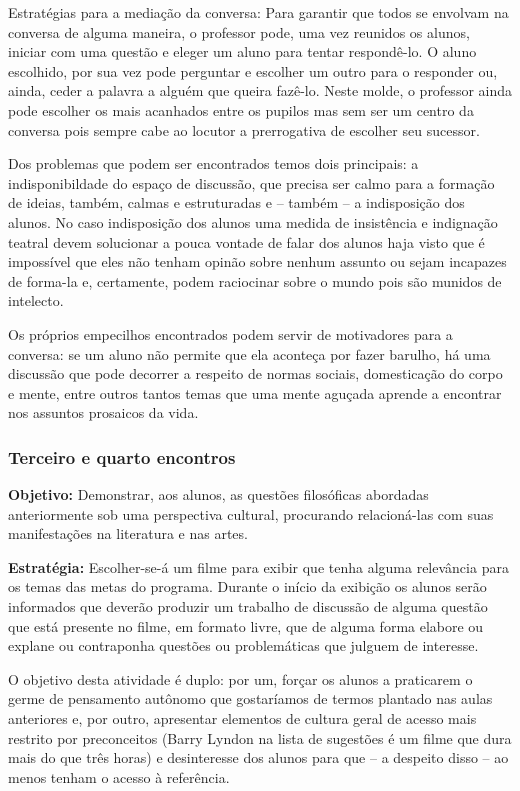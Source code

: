 \documentclass[12pt,a4paper]{article}
\newenvironment{citac}{
	\begin{addmargin}[4cm]{1em} \footnotesize}{\normalfont \end{addmargin}
}
\begin{document}
\begin{citac}
	Estratégias para a mediação da conversa: Para garantir que todos 
	se envolvam na conversa de alguma maneira, o professor pode, uma 
	vez reunidos os alunos, iniciar com uma questão e eleger um aluno 
	para tentar respondê-lo. O aluno escolhido, por sua vez pode 
	perguntar e escolher um outro para o responder ou, ainda, ceder a 
	palavra a alguém que queira fazê-lo. Neste molde, o professor 
	ainda pode escolher os mais acanhados entre os pupilos mas sem 
	ser um centro da conversa pois sempre cabe ao locutor a 
	prerrogativa de escolher seu sucessor.
	
	Dos problemas que podem ser encontrados temos dois principais:
	a indisponibildade do espaço de discussão, que precisa ser calmo 
	para a formação de ideias, também, calmas e estruturadas e -- 
	também -- a indisposição dos alunos. No caso indisposição dos 
	alunos uma medida de insistência e indignação teatral devem 
	solucionar a pouca vontade de falar dos alunos haja visto que é 
	impossível que eles não tenham opinão sobre nenhum assunto ou 
	sejam incapazes de forma-la e, certamente, podem raciocinar sobre 
	o mundo pois são munidos de intelecto.

	Os próprios empecilhos encontrados podem servir de motivadores 
	para a conversa: se um aluno não permite que ela aconteça por 
	fazer barulho, há uma discussão que pode decorrer a respeito 
	de normas sociais, domesticação do corpo e mente, entre outros 
	tantos temas que uma mente aguçada aprende a encontrar nos 
	assuntos prosaicos da vida.

	\subsubsection{Terceiro e quarto encontros}
	
	\textbf{Objetivo:} Demonstrar, aos alunos, as questões 
	filosóficas abordadas anteriormente sob uma perspectiva 
	cultural, procurando relacioná-las com suas manifestações 
	na literatura e nas artes. 

	\textbf{Estratégia:}
	Escolher-se-á um filme para exibir que tenha alguma relevância 
	para os temas das metas do programa. Durante o início da 
	exibição os alunos serão informados que deverão produzir um 
	trabalho de discussão de alguma questão que está presente no 
	filme, em formato livre, que de alguma forma elabore ou 
	explane ou contraponha questões ou problemáticas que julguem
	de interesse. 

	O objetivo desta atividade é duplo: por um, forçar os alunos 
	a praticarem o germe de pensamento autônomo que gostaríamos 
	de termos plantado nas aulas anteriores e, por outro, apresentar
	elementos de cultura geral de acesso mais restrito por 
	preconceitos (Barry Lyndon na lista de sugestões é um filme 
	que dura mais do que três horas) e desinteresse dos alunos para 
	que -- a despeito disso -- ao menos tenham o acesso à referência. 


\end{citac}
\end{document}
